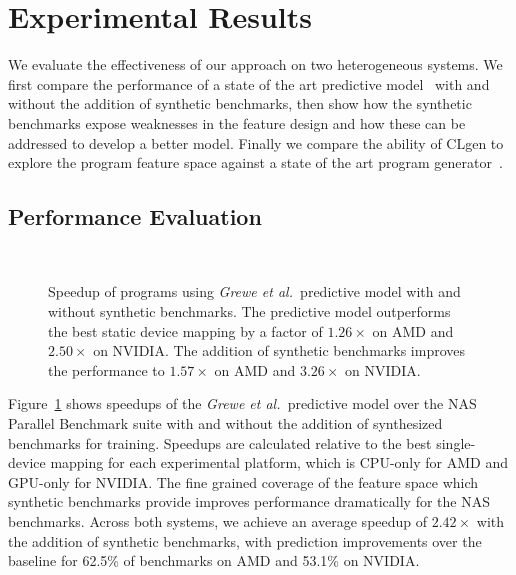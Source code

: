 \section{Experimental Results}%
\label{sec:results}

We evaluate the effectiveness of our approach on two heterogeneous systems. We first compare the performance of a state of the art predictive model~\cite{Grewe2013} with and without the addition of synthetic benchmarks, then show how the synthetic benchmarks expose weaknesses in the feature design and how these can be addressed to develop a better model. Finally we compare the ability of CLgen to explore the program feature space against a state of the art program generator~\cite{Lidbury2015a}.

\subsection{Performance Evaluation}%
\label{subsec:eval-cgo13}

\begin{figure}
  \centering %
  \\%
  \caption{Speedup of programs using \emph{Grewe et al.\ }predictive model with and without synthetic benchmarks. The predictive model outperforms the best static device mapping by a factor of $1.26\times$ on AMD and $2.50\times$ on NVIDIA. The addition of synthetic benchmarks improves the performance to $1.57\times$ on AMD and $3.26\times$ on NVIDIA.}%
  \label{fig:npb}
\end{figure}

Figure~\ref{fig:npb} shows speedups of the \emph{Grewe et al.\ }predictive model over the NAS Parallel Benchmark suite with and without the addition of synthesized benchmarks for training. Speedups are calculated relative to the best single-device mapping for each experimental platform, which is CPU-only
for AMD and GPU-only for NVIDIA. The fine grained coverage of the feature space which synthetic benchmarks provide improves performance dramatically for the NAS benchmarks. Across both systems, we achieve an average speedup of $2.42\times$ with the addition of synthetic benchmarks, with prediction improvements over the baseline for 62.5\% of benchmarks on AMD and 53.1\% on NVIDIA.

